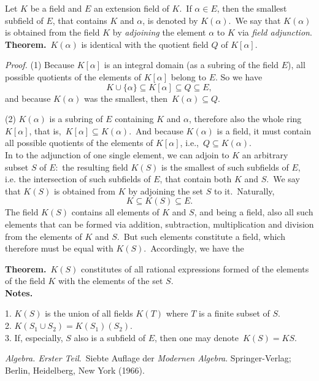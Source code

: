 \documentclass[12pt]{article}
\theoremstyle{definition}
\begin{document}
Let $K$ be a field and $E$ an extension field of $K$.\, If $\alpha 
\in E$, then the smallest subfield of $E$, that contains $K$ and 
$\alpha$, is denoted by  $K(\alpha)$.\, We say that $K(\alpha)$ is 
obtained from the field $K$ by {\em adjoining} the element $\alpha$ 
to $K$ via {\em field adjunction}.\\

\textbf{Theorem.}\, $K(\alpha)$ is identical with the quotient field $Q$ of $K[\alpha]$.

{\it Proof.}  (1)  Because $K[\alpha]$ is an integral domain (as a subring of the field $E$), all possible quotients of the elements of $K[\alpha]$ belong to $E$. So we have
  $$K\cup\{\alpha\} \subseteq K[\alpha] \subseteq Q \subseteq E,$$
and because $K(\alpha)$ was the smallest, then \,$K(\alpha) \subseteq Q.$

(2)  $K(\alpha)$ is a subring of $E$ containing $K$ and $\alpha$, therefore also the whole ring $K[\alpha]$, that is, \,$K[\alpha] \subseteq K(\alpha)$. \,And because $K(\alpha)$ is a field, it must contain all possible quotients of the elements of $K[\alpha]$, i.e., \,$Q \subseteq K(\alpha)$.\\


In  to the adjunction of one single element, we can adjoin to $K$ an arbitrary subset $S$ of $E$:\, the resulting field $K(S)$ is the smallest of such subfields of $E$, i.e. the intersection of such subfields of $E$, that contain both $K$ and $S$.\, We say that $K(S)$ is obtained from $K$ by adjoining the set $S$ to it.\, Naturally,
                    $$K \subseteq K(S) \subseteq E.$$
The field $K(S)$ contains all elements of $K$ and $S$, and being a field, also all such elements that can be formed via addition, subtraction, multiplication and division from the elements of $K$ and $S$.\, But such elements constitute a field, which therefore must be equal with $K(S)$.\, Accordingly, we have the

\textbf{Theorem.}\, $K(S)$ constitutes of all rational expressions formed of the elements of the field $K$ with the elements of the set $S$.\\


\textbf{Notes.}

1. $K(S)$ is the union of all fields $K(T)$ where $T$ is a finite subset of $S$.\\
2. $K(S_1 \cup S_2) = K(S_1)(S_2)$.\\
3. If, especially, $S$ also is a subfield of $E$, then one may denote\, $K(S) = KS$.

\begin{thebibliography}{9}
 {\em Algebra. Erster Teil}.\, Siebte Auflage der {\em Modernen Algebra}. Springer-Verlag; Berlin, Heidelberg, New York (1966).
\end{thebibliography}



\end{document}
